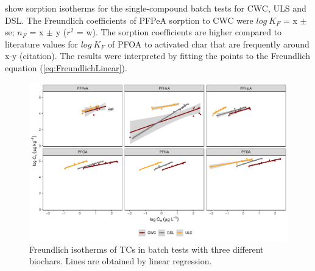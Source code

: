  show sorption isotherms for the single-compound batch tests for CWC, ULS and DSL.
The Freundlich coefficients of PFPeA sorption to CWC were $log~K_F$ = x $\pm$ se; $n_F$ = x $\pm$ y ($r^2$ = w). The sorption coefficients are higher compared to literature values for $log~K_F$ of PFOA to activated char that are frequently around x-y (citation). The results were interpreted by fitting the points to the Freundlich equation (\cref{eq:FreundlichLinear}).  

\begin{figure}
    \centering
    \includegraphics[width=\textwidth]{R/figs/Sorption_isotherms_single_BC.pdf}
    \caption{Freundlich isotherms of TCs in batch tests with three different biochars. Lines are obtained by linear regression.}
    \label{fig:sorption_isotherms}
\end{figure}

